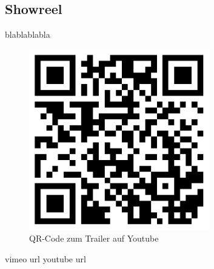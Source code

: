 \subsection{Showreel}

blablablabla
\begin{figure}[htbp]
	\centering
		\includegraphics[width=0.7\textwidth]{images/qrcode.png}
	\caption{QR-Code zum Trailer auf Youtube}
	\label{fig:qrcode}
\end{figure}

vimeo url
youtube url